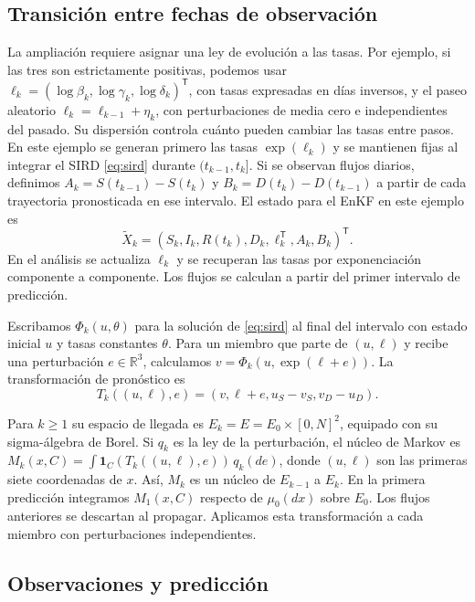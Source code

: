 \subsection*{Transición entre fechas de observación}

La ampliación requiere asignar una ley de evolución a las tasas. Por ejemplo, si las tres son estrictamente positivas, podemos usar $\ell_k=(\log\beta_k,\log\gamma_k,\log\delta_k)^{\mathsf T}$, con tasas expresadas en días inversos, y el paseo aleatorio $\ell_k=\ell_{k-1}+\eta_k$, con perturbaciones de media cero e independientes del pasado. Su dispersión controla cuánto pueden cambiar las tasas entre pasos. En este ejemplo se generan primero las tasas $\exp(\ell_k)$ y se mantienen fijas al integrar el SIRD \eqref{eq:sird} durante $(t_{k-1},t_k]$.
Si se observan flujos diarios, definimos $A_k=S(t_{k-1})-S(t_k)$ y $B_k=D(t_k)-D(t_{k-1})$ a partir de cada trayectoria pronosticada en ese intervalo. El estado para el EnKF en este ejemplo es
\begin{equation}
    \widetilde X_k=(S_k,I_k,R(t_k),D_k,\ell_k^{\mathsf T},A_k,B_k)^{\mathsf T}.
    \label{eq:estado-enkf}
\end{equation}
En el análisis se actualiza $\ell_k$ y se recuperan las tasas por exponenciación componente a componente. Los flujos se calculan a partir del primer intervalo de predicción.

Escribamos $\Phi_k(u,\theta)$ para la solución de \eqref{eq:sird} al final del intervalo con estado inicial $u$ y tasas constantes $\theta$. Para un miembro que parte de $(u,\ell)$ y recibe una perturbación $e\in\mathbb R^3$, calculamos $v=\Phi_k(u,\exp(\ell+e))$. La transformación de pronóstico es
\[
 T_k((u,\ell),e)=(v,\ell+e,u_S-v_S,v_D-u_D).
\]

Para $k\geq1$ su espacio de llegada es $E_k=E=E_0\times[0,N]^2$, equipado con su sigma-álgebra de Borel. Si $q_k$ es la ley de la perturbación, el núcleo de Markov es $M_k(x,C)=\int \mathbf 1_C(T_k((u,\ell),e))\,q_k(de)$, donde $(u,\ell)$ son las primeras siete coordenadas de $x$. Así, $M_k$ es un núcleo de $E_{k-1}$ a $E_k$. En la primera predicción integramos $M_1(x,C)$ respecto de $\mu_0(dx)$ sobre $E_0$. Los flujos anteriores se descartan al propagar. Aplicamos esta transformación a cada miembro con perturbaciones independientes.

\subsection*{Observaciones y predicción}

